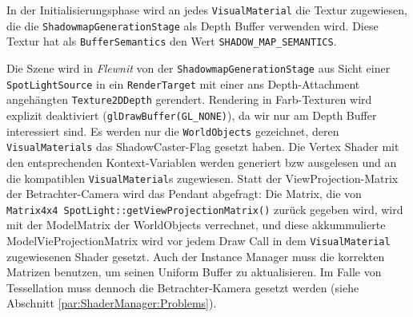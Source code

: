 	In der Initialisierungsphase wird an jedes \lstinline|VisualMaterial| die Textur zugewiesen,
	die die \lstinline|ShadowmapGenerationStage| als Depth Buffer verwenden wird. Diese 
	Textur hat als \lstinline|BufferSemantics| den Wert \lstinline|SHADOW_MAP_SEMANTICS|.
	
	Die Szene wird in \emph{Flewnit} von der \lstinline|ShadowmapGenerationStage| aus Sicht einer
	\lstinline|SpotLightSource| in ein \lstinline|RenderTarget|  mit einer ans
	Depth-Attachment angehängten \lstinline|Texture2DDepth| gerendert.
	Rendering in Farb-Texturen wird explizit deaktiviert (\lstinline|glDrawBuffer(GL_NONE)|),
	da wir nur am Depth Buffer interessiert sind.
	Es werden nur die \lstinline|WorldObjects| gezeichnet, deren \lstinline|VisualMaterials| 
	das ShadowCaster-Flag gesetzt haben. Die Vertex Shader mit den entsprechenden Kontext-Variablen
	werden generiert bzw ausgelesen und an die kompatiblen \lstinline|VisualMaterial|s zugewiesen.
	Statt der ViewProjection-Matrix der Betrachter-Camera wird das Pendant abgefragt:
	Die Matrix, die von 
	\lstinline|Matrix4x4 SpotLight::getViewProjectionMatrix()| zurück gegeben wird, wird mit der ModelMatrix
	der WorldObjects verrechnet, und diese akkummulierte ModelVieProjectionMatrix wird vor jedem Draw Call 
	in dem \lstinline|VisualMaterial| zugewiesenen Shader gesetzt. Auch der Instance Manager muss die korrekten
	Matrizen benutzen, um seinen Uniform Buffer zu aktualisieren.
	Im Falle von Tessellation muss dennoch die Betrachter-Kamera gesetzt werden (siehe Abschnitt 
	\ref{par:ShaderManager:Problems}).
	
